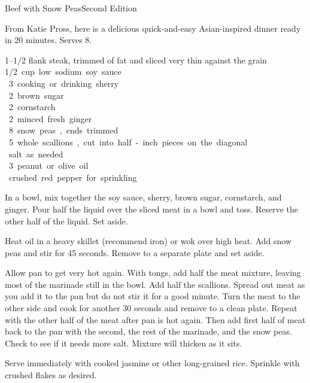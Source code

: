 \begin{entry}{Beef with Snow Peas}{Second Edition}

\begin{open}
From Katie Pross, here is a delicious quick-and-easy Asian-inspired dinner ready in 20 minutes. Serves 8.
\end{open}
\begin{ingredients}
  \SIrange{1}{1/2}{\pound} flank steak, trimmed of fat and sliced very thin against the grain\\
  \SI{1/2} cup low sodium soy sauce\\
  \SI{3}{\tblspoon} cooking or drinking sherry\\
  \SI{2}{\tblspoon} brown sugar \\
  \SI{2}{\tblspoon} cornstarch \\
  \SI{2}{\teaspoon} minced fresh ginger\\
  \SI{8}{\ounce} snow peas, ends trimmed \\
   5 whole scallions, cut into half-inch pieces on the diagonal \\ 
  salt as needed \\
    \SI{3}{\tblspoon} peanut or olive oil \\
  crushed red pepper for sprinkling \\
  
\end{ingredients}

In a bowl, mix together the soy sauce, sherry, brown sugar, cornstarch, and ginger. Pour half the liquid over the sliced meat in a bowl and toss. Reserve the other half of the liquid. Set aside.

Heat oil in a heavy skillet (recommend iron) or wok over high heat. Add snow peas and stir for 45 seconds. Remove to a separate plate and set aside.

Allow pan to get very hot again. With tongs, add half the meat mixture, leaving most of the marinade still in the bowl. Add half the scallions. Spread out meat as you add it to the pan but do not stir it for a good minute. Turn the meat to the other side and cook for another 30 seconds and remove to a clean plate. Repeat with the other half of the meat after pan is hot again. Then add first half of meat back to the pan with the second, the rest of the marinade, and the snow peas. Check to see if it needs more salt. Mixture will thicken as it sits. 

Serve immediately with cooked jasmine or other long-grained rice. Sprinkle with crushed flakes as desired. 

\end{entry}

